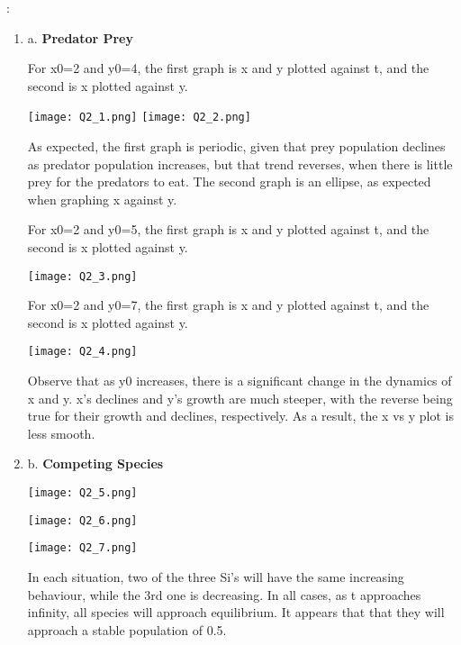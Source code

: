 \documentclass[12pt]{amsart}
\newcounter{probnum}
\newenvironment{prob}{\begin{enumerate}\setcounter{enumi}{\value{probnum}}}%
 {\setcounter{probnum}{\value{enumi}}\end{enumerate}}
\begin{document}
:  

\begin{prob}
\item[a.] {\bf Predator Prey}
  
  \noindent For x0=2 and y0=4, the first graph is x and y plotted against t, and the second is x plotted against y.

\begin{center} 
    \texttt{[image: Q2\_1.png]}
    \vspace{0.5em} 
    \texttt{[image: Q2\_2.png]}

\end{center}
    
\noindent As expected, the first graph is periodic, given that prey population declines as predator population increases, but that trend reverses, when there is little prey for the predators to eat. The second graph is an ellipse, as expected when graphing x against y.
    
\noindent For x0=2 and y0=5, the first graph is x and y plotted against t, and the second is x plotted against y.
  
\begin{center} 
    \texttt{[image: Q2\_3.png]}
\end{center}
\noindent  For x0=2 and y0=7, the first graph is x and y plotted against t, and the second is x plotted against y.
  
\begin{center} 
    \texttt{[image: Q2\_4.png]}
\end{center}
\noindent Observe that as y0 increases, there is a significant change in the dynamics of x and y. x's declines and y's growth are much steeper, with the reverse being true for their growth and declines, respectively. As a result, the x vs y plot is less smooth.

\bigskip 
 \item[b.] {\bf Competing Species}
  
\begin{center} 
    \texttt{[image: Q2\_5.png]}
    \vspace{0.5em} 

    \texttt{[image: Q2\_6.png]}
    \vspace{0.5em} 

    \texttt{[image: Q2\_7.png]}
\end{center}
  
  \noindent In each situation, two of the three Si's will have the same increasing behaviour, while the 3rd one is decreasing. In all cases, as t approaches infinity, all species will approach equilibrium. It appears that that they will approach a stable population of 0.5.


 \end{prob}
\end{document}
